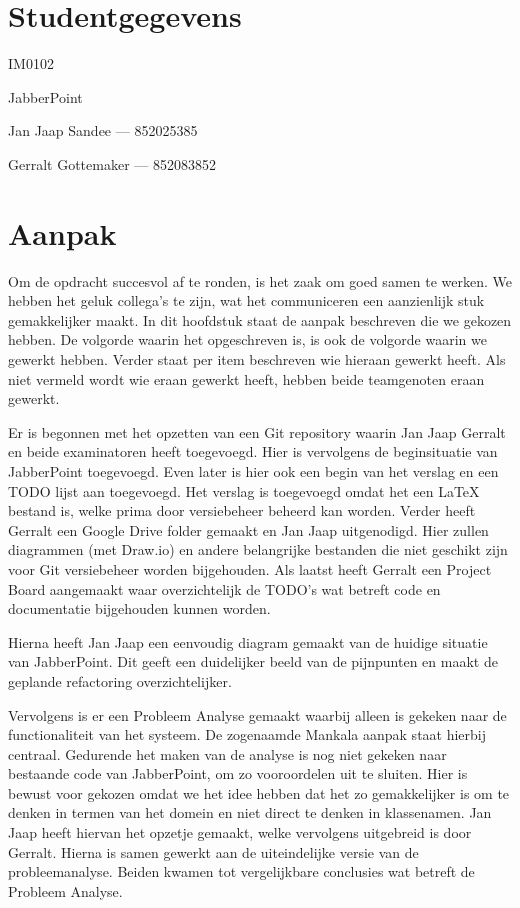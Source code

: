 \documentclass[a4paper]{article}
\newcommand{\1}[0]{\'{e}\'{e}n}
\begin{document}
\pagestyle{fancy}

\section*{Studentgegevens}
\begin{description}
	\item [Cursuscode] IM0102
	\item JabberPoint
    \item Jan Jaap Sandee --- 852025385
	\item Gerralt Gottemaker --- 852083852
\end{description}

\section*{Aanpak}
Om de opdracht succesvol af te ronden, is het zaak om goed samen te werken. We hebben het geluk collega's te zijn, wat het communiceren een aanzienlijk stuk gemakkelijker maakt. In dit hoofdstuk staat de aanpak beschreven die we gekozen hebben. De volgorde waarin het opgeschreven is, is ook de volgorde waarin we gewerkt hebben. Verder staat per item beschreven wie hieraan gewerkt heeft. Als niet vermeld wordt wie eraan gewerkt heeft, hebben beide teamgenoten eraan gewerkt.

Er is begonnen met het opzetten van een Git repository waarin Jan Jaap Gerralt en beide examinatoren heeft toegevoegd. Hier is vervolgens de beginsituatie van JabberPoint toegevoegd. Even later is hier ook een begin van het verslag en een TODO lijst aan toegevoegd. Het verslag is toegevoegd omdat het een LaTeX bestand is, welke prima door versiebeheer beheerd kan worden. Verder heeft Gerralt een Google Drive folder gemaakt en Jan Jaap uitgenodigd. Hier zullen diagrammen (met Draw.io) en andere belangrijke bestanden die niet geschikt zijn voor Git versiebeheer worden bijgehouden. Als laatst heeft Gerralt een Project Board aangemaakt waar overzichtelijk de TODO's wat betreft code en documentatie bijgehouden kunnen worden.

Hierna heeft Jan Jaap een eenvoudig diagram gemaakt van de huidige situatie van JabberPoint. Dit geeft een duidelijker beeld van de pijnpunten en maakt de geplande refactoring overzichtelijker.

Vervolgens is er een Probleem Analyse gemaakt waarbij alleen is gekeken naar de functionaliteit van het systeem. De zogenaamde Mankala aanpak staat hierbij centraal. Gedurende het maken van de analyse is nog niet gekeken naar bestaande code van JabberPoint, om zo vooroordelen uit te sluiten. Hier is bewust voor gekozen omdat we het idee hebben dat het zo gemakkelijker is om te denken in termen van het domein en niet direct te denken in klassenamen. Jan Jaap heeft hiervan het opzetje gemaakt, welke vervolgens uitgebreid is door Gerralt. Hierna is samen gewerkt aan de uiteindelijke versie van de probleemanalyse. Beiden kwamen tot vergelijkbare conclusies wat betreft de Probleem Analyse.
\end{document}
